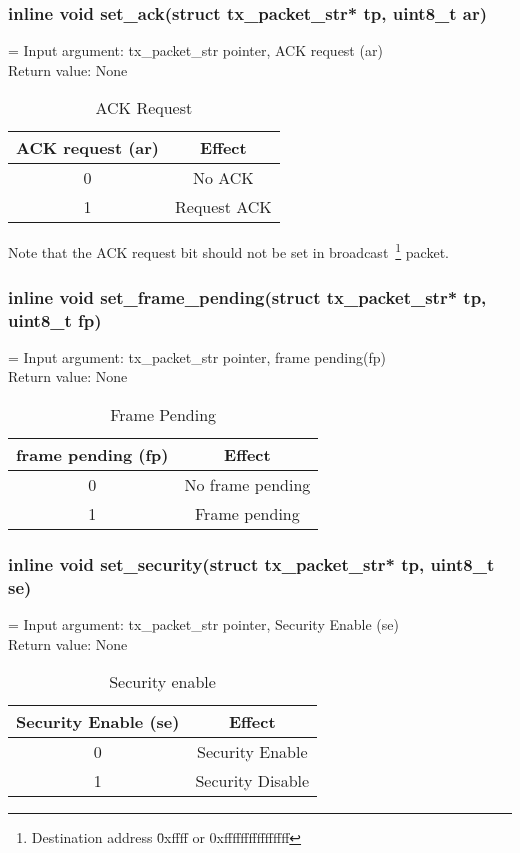 \subsubsection{inline void set\_ack(struct tx\_packet\_str* tp, uint8\_t ar)}
\hangindent=\parindent
{}
Input argument: tx\_packet\_str pointer, ACK request (ar)\\
Return value: None\\
\begin{table}[h]
\centering
	\begin{tabular}{|c|c|}
	\hline
	{\bf ACK request (ar)} & {\bf Effect}\\ \hline
	0 & No ACK\\ \hline
	1 & Request ACK\\ \hline
	\end{tabular}
	\caption{ACK Request}
\end{table}
Note that the ACK request bit should not be set in broadcast~\footnote{
Destination address \= 0xffff or 0xffffffffffffffff} packet.


\subsubsection{inline void set\_frame\_pending(struct tx\_packet\_str* tp, uint8\_t fp)}
\hangindent=\parindent
{}
Input argument: tx\_packet\_str pointer, frame pending(fp)\\
Return value: None\\
\begin{table}[h]
\centering
	\begin{tabular}{|c|c|}
	\hline
	{\bf frame pending (fp)} & {\bf Effect}\\ \hline
	0 & No frame pending\\ \hline
	1 & Frame pending\\ \hline
	\end{tabular}
	\caption{Frame Pending}
\end{table}

\subsubsection{inline void set\_security(struct tx\_packet\_str* tp, uint8\_t se)}
\hangindent=\parindent
{}
Input argument: tx\_packet\_str pointer, Security Enable (se)\\
Return value: None\\
\begin{table}[h]
\centering
	\begin{tabular}{|c|c|}
	\hline
	{\bf Security Enable (se)} & {\bf Effect}\\ \hline
	0 & Security Enable\\ \hline
	1 & Security Disable\\ \hline
	\end{tabular}
	\caption{Security enable}
\end{table}

